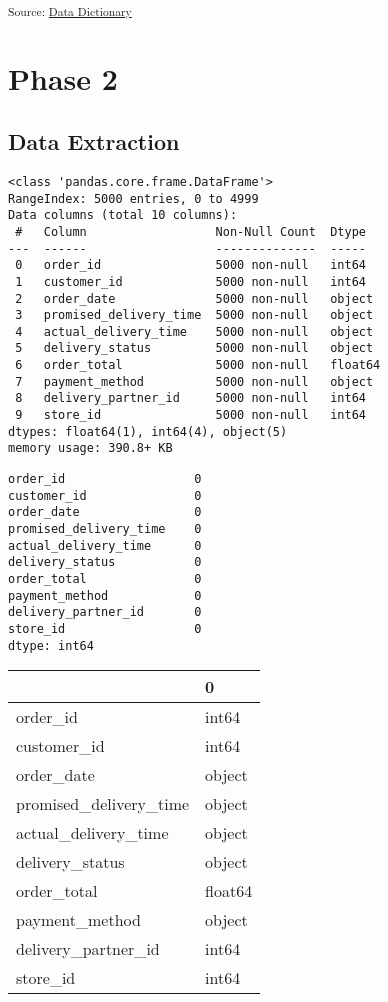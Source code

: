 \documentclass[
  letterpaper,
  DIV=11,
  numbers=noendperiod]{scrartcl}
\begin{document}
\textsubscript{Source:
\href{https://plot-masters.github.io/customer-segmentation/notebook/data_dictionary.ipynb.html\#cff88bb5}{Data
Dictionary}}

\section{Phase 2}\label{phase-2}

\subsection{Data Extraction}\label{data-extraction}

\begin{verbatim}
<class 'pandas.core.frame.DataFrame'>
RangeIndex: 5000 entries, 0 to 4999
Data columns (total 10 columns):
 #   Column                  Non-Null Count  Dtype  
---  ------                  --------------  -----  
 0   order_id                5000 non-null   int64  
 1   customer_id             5000 non-null   int64  
 2   order_date              5000 non-null   object 
 3   promised_delivery_time  5000 non-null   object 
 4   actual_delivery_time    5000 non-null   object 
 5   delivery_status         5000 non-null   object 
 6   order_total             5000 non-null   float64
 7   payment_method          5000 non-null   object 
 8   delivery_partner_id     5000 non-null   int64  
 9   store_id                5000 non-null   int64  
dtypes: float64(1), int64(4), object(5)
memory usage: 390.8+ KB
\end{verbatim}

\begin{verbatim}
order_id                  0
customer_id               0
order_date                0
promised_delivery_time    0
actual_delivery_time      0
delivery_status           0
order_total               0
payment_method            0
delivery_partner_id       0
store_id                  0
dtype: int64
\end{verbatim}

\begin{longtable}[]{@{}ll@{}}
\toprule\noalign{}
& 0 \\
\midrule\noalign{}
\endhead
\bottomrule\noalign{}
\endlastfoot
order\_id & int64 \\
customer\_id & int64 \\
order\_date & object \\
promised\_delivery\_time & object \\
actual\_delivery\_time & object \\
delivery\_status & object \\
order\_total & float64 \\
payment\_method & object \\
delivery\_partner\_id & int64 \\
store\_id & int64 \\
\end{longtable}
\end{document}
